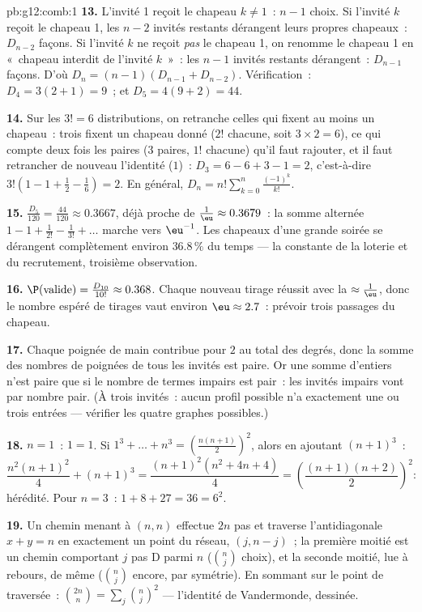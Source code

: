 \begin{solution}{pb:g12:comb:1}
\textbf{13.} L'invité 1 reçoit le chapeau $k \neq 1$~: $n - 1$
choix. Si l'invité $k$ reçoit le chapeau 1, les $n - 2$ invités
restants dérangent leurs propres chapeaux~: $D_{n-2}$ façons. Si
l'invité $k$ ne reçoit \emph{pas} le chapeau 1, on renomme le
chapeau 1 en «~chapeau interdit de l'invité $k$~»~: les $n - 1$
invités restants dérangent~: $D_{n-1}$ façons. D'où
$D_n = (n-1)(D_{n-1} + D_{n-2})$. Vérification~:
$D_4 = 3(2 + 1) = 9$~; et $D_5 = 4(9 + 2) = 44$.

\textbf{14.} Sur les $3! = 6$ distributions, on retranche celles
qui fixent au moins un chapeau~: trois fixent un chapeau donné
($2!$ chacune, soit $3 \times 2 = 6$), ce qui compte deux fois les
paires ($3$ paires, $1!$ chacune) qu'il faut rajouter, et il faut
retrancher de nouveau l'identité ($1$)~:
$D_3 = 6 - 6 + 3 - 1 = 2$, c'est-à-dire
$3!\left(1 - 1 + \frac12 - \frac16\right) = 2$. En général,
$D_n = n!\sum_{k=0}^{n} \frac{(-1)^k}{k!}$.

\textbf{15.} $\frac{D_5}{120} = \frac{44}{120} \approx 0.3667$,
déjà proche de $\frac1\eu \approx 0.3679$~: la somme alternée
$1 - 1 + \frac{1}{2!} - \frac{1}{3!} + \dots$ marche vers
$\eu^{-1}$. Les chapeaux d'une grande soirée se dérangent
complètement environ $36.8\,\%$ du temps --- la constante de la
loterie et du recrutement, troisième observation.

\textbf{16.} $\P(\text{valide}) = \frac{D_{10}}{10!} \approx
0.368$. Chaque nouveau tirage réussit avec la 
$\approx \frac1\eu$, donc le nombre espéré de tirages vaut environ
$\eu \approx 2.7$~: prévoir trois passages du chapeau.

\textbf{17.} Chaque poignée de main contribue pour $2$ au total des
degrés, donc la somme des nombres de poignées de tous les invités
est paire. Or une somme d'entiers n'est paire que si le nombre de
termes impairs est pair~: les invités impairs vont par nombre pair.
(À trois invités~: aucun profil possible n'a exactement une ou trois
entrées  --- vérifier les quatre graphes possibles.)

\textbf{18.} $n = 1$~: $1 = 1$. Si
$1^3 + \dots + n^3 = \left(\frac{n(n+1)}{2}\right)^2$, alors en
ajoutant $(n+1)^3$~:
\[
\frac{n^2(n+1)^2}{4} + (n+1)^3
= \frac{(n+1)^2\left(n^2 + 4n + 4\right)}{4}
= \left(\frac{(n+1)(n+2)}{2}\right)^{\!2} :
\]
hérédité. Pour $n = 3$~: $1 + 8 + 27 = 36 = 6^2$.

\textbf{19.} Un chemin menant à $(n, n)$ effectue $2n$ pas et
traverse l'antidiagonale $x + y = n$ en exactement un point du
réseau, $(j, n - j)$~; la première moitié est un chemin comportant
$j$ pas D parmi $n$ ($\binom nj$ choix), et la seconde moitié, lue à
rebours, de même ($\binom nj$ encore, par symétrie). En sommant sur
le point de traversée~: $\binom{2n}{n} = \sum_j \binom nj^2$ ---
l'identité de Vandermonde, dessinée.


\end{solution}
